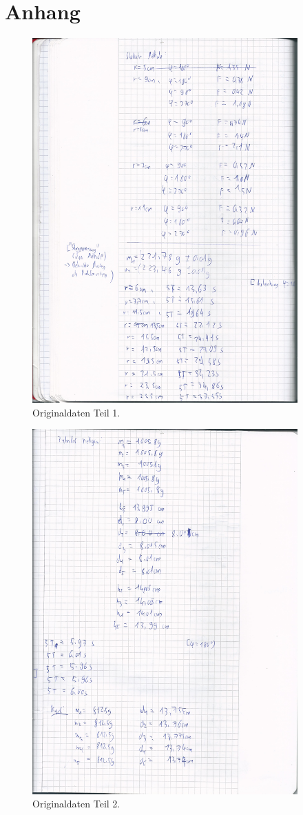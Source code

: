 \section{Anhang}
\begin{figure}[H]
  \centering
  \includegraphics[height=14cm]{original1.jpg}
  \caption{Originaldaten Teil 1.}
  \label{fig:original1}
\end{figure}

\begin{figure}[H]
  \centering
  \includegraphics[height=14cm]{original2.jpg}
  \caption{Originaldaten Teil 2.}
  \label{fig:original2}
\end{figure}

